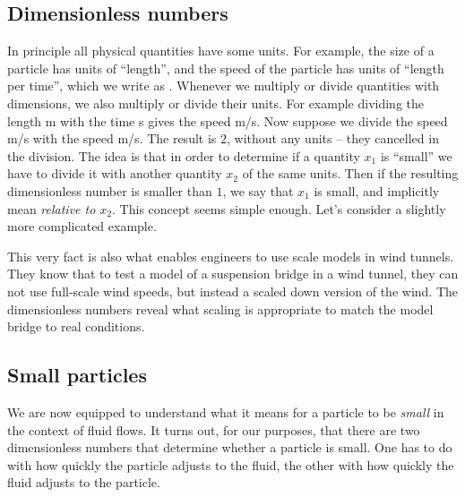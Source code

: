 \documentclass[thesis.tex]{subfiles}
\begin{document}
\subsection*{Dimensionless numbers}

In principle all physical quantities have some units. For example, the size of a particle has units of ``length'', and the speed of the particle has units of ``length per time'', which we write as . Whenever we multiply or divide quantities with dimensions, we also multiply or divide their units. For example dividing the length \unit[20]{m} with the time \unit[5]{s} gives the speed \unit[4]{m/s}. Now suppose we divide the speed \unit[4]{m/s} with the speed \unit[2]{m/s}. The result is $2$, without any units -- they cancelled in the division. The idea is that in order to determine if a quantity $x_1$ is ``small'' we have to divide it with another quantity $x_2$ of the same units. Then if the resulting dimensionless number is smaller than $1$, we say that $x_1$ is small, and implicitly mean \emph{relative to $x_2$}.  This concept seems simple enough. Let's consider a slightly more complicated example.

 This very fact is also what enables engineers to use scale models in wind tunnels. They know that to test a model of a suspension bridge in a wind tunnel, they can not use full-scale wind speeds, but instead a scaled down version of the wind. The dimensionless numbers reveal what scaling is appropriate to match the model bridge to real conditions.

\subsection*{Small particles}

We are now equipped to understand what it means for a particle to be \emph{small} in the context of fluid flows. It turns out, for our purposes, that there are two dimensionless numbers that determine whether a particle is small. One has to do with how quickly the particle adjusts to the fluid, the other with how quickly the fluid adjusts to the particle.
\end{document}
